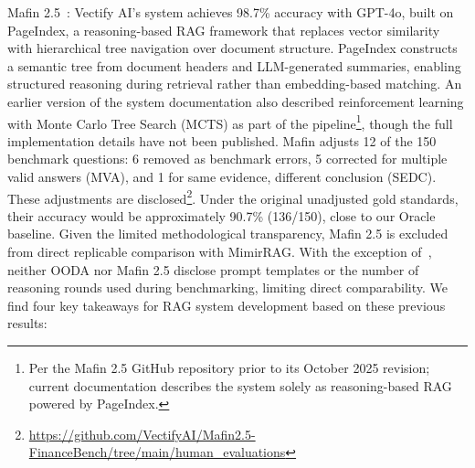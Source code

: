 \documentclass[final,5p,times,twopage,twocolumn,a4paper]{elsarticle}
\begin{document}
Mafin 2.5~\cite{vectify2025mafingithub}: Vectify AI's system achieves 98.7\% accuracy with GPT-4o, built on PageIndex, a reasoning-based RAG framework that replaces vector similarity with hierarchical tree navigation over document structure. PageIndex constructs a semantic tree from document headers and LLM-generated summaries, enabling structured reasoning during retrieval rather than embedding-based matching. An earlier version of the system documentation also described reinforcement learning with Monte Carlo Tree Search (MCTS) as part of the pipeline\footnote{Per the Mafin 2.5 GitHub repository prior to its October 2025 revision; current documentation describes the system solely as reasoning-based RAG powered by PageIndex.}, though the full implementation details have not been published. Mafin adjusts 12 of the 150 benchmark questions: 6 removed as benchmark errors, 5 corrected for multiple valid answers (MVA), and 1 for same evidence, different conclusion (SEDC). These adjustments are disclosed\footnote{\url{https://github.com/VectifyAI/Mafin2.5-FinanceBench/tree/main/human_evaluations}}. Under the original unadjusted gold standards, their accuracy would be approximately 90.7\% (136/150), close to our Oracle baseline. Given the limited methodological transparency, Mafin 2.5 is excluded from direct replicable comparison with MimirRAG. With the exception of~\cite{Leng2024LongCRA}, neither OODA nor Mafin 2.5 disclose prompt templates or the number of reasoning rounds used during benchmarking, limiting direct comparability. We find four key takeaways for RAG system development based on these previous results:
%
\end{document}
